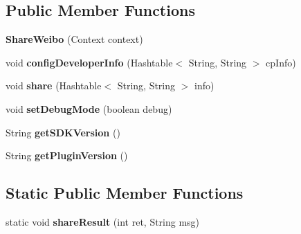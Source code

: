 \subsection*{Public Member Functions}
\begin{DoxyCompactItemize}
\item 
\mbox{\label{classorg_1_1cocos2dx_1_1plugin_1_1ShareWeibo_aed6d523e0d58210b8ddfff8d6552bd82}} 
{\bfseries Share\+Weibo} (Context context)
\item 
\mbox{\label{classorg_1_1cocos2dx_1_1plugin_1_1ShareWeibo_ae934fb3c98c2e8a04da2a8469c07551a}} 
void {\bfseries config\+Developer\+Info} (Hashtable$<$ String, String $>$ cp\+Info)
\item 
\mbox{\label{classorg_1_1cocos2dx_1_1plugin_1_1ShareWeibo_af7c12785cbf476c2f79c6e4297eca2e8}} 
void {\bfseries share} (Hashtable$<$ String, String $>$ info)
\item 
\mbox{\label{classorg_1_1cocos2dx_1_1plugin_1_1ShareWeibo_a5ab311eb3839c9065ec25ba08c06f69c}} 
void {\bfseries set\+Debug\+Mode} (boolean debug)
\item 
\mbox{\label{classorg_1_1cocos2dx_1_1plugin_1_1ShareWeibo_ac5d85c538064f2c9e6e0a34f2bf2eb31}} 
String {\bfseries get\+S\+D\+K\+Version} ()
\item 
\mbox{\label{classorg_1_1cocos2dx_1_1plugin_1_1ShareWeibo_a293cf7983b103474f94484a96e076064}} 
String {\bfseries get\+Plugin\+Version} ()
\end{DoxyCompactItemize}
\subsection*{Static Public Member Functions}
\begin{DoxyCompactItemize}
\item 
\mbox{\label{classorg_1_1cocos2dx_1_1plugin_1_1ShareWeibo_a9ea5822ac6aba0b7516428f5abca013c}} 
static void {\bfseries share\+Result} (int ret, String msg)
\end{DoxyCompactItemize}
